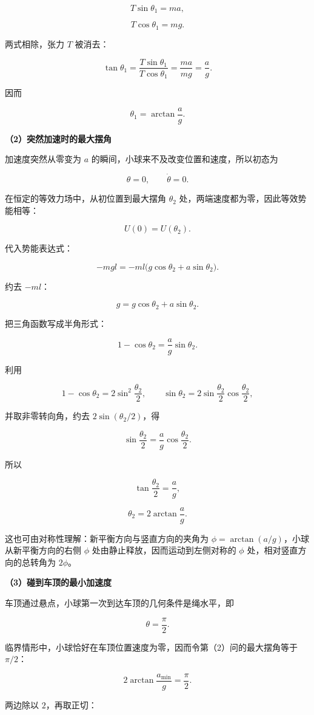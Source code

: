 \documentclass[12pt,a4paper,UTF8]{ctexart}
\begin{document}
\[T\sin\theta_1=ma,\]

\[T\cos\theta_1=mg.\]

两式相除，张力 \(T\) 被消去：

\[\tan\theta_1=\frac{T\sin\theta_1}{T\cos\theta_1}=\frac{ma}{mg}=\frac ag.\]

因而

\[\boxed{\theta_1=\arctan\frac ag}.\]

\textbf{（2）突然加速时的最大摆角}

加速度突然从零变为 \(a\) 的瞬间，小球来不及改变位置和速度，所以初态为

\[\theta=0,\qquad \dot\theta=0.\]

在恒定的等效力场中，从初位置到最大摆角 \(\theta_2\)
处，两端速度都为零，因此等效势能相等：

\[U(0)=U(\theta_2).\]

代入势能表达式：

\[-mgl=-ml\bigl(g\cos\theta_2+a\sin\theta_2\bigr).\]

约去 \(-ml\)：

\[g=g\cos\theta_2+a\sin\theta_2.\]

把三角函数写成半角形式：

\[1-\cos\theta_2=\frac ag\sin\theta_2.\]

利用

\[1-\cos\theta_2=2\sin^2\frac{\theta_2}{2},\qquad
\sin\theta_2=2\sin\frac{\theta_2}{2}\cos\frac{\theta_2}{2},\]

并取非零转向角，约去 \(2\sin(\theta_2/2)\)，得

\[\sin\frac{\theta_2}{2}=\frac ag\cos\frac{\theta_2}{2}.\]

所以

\[\tan\frac{\theta_2}{2}=\frac ag,\]

\[\boxed{\theta_2=2\arctan\frac ag}.\]

这也可由对称性理解：新平衡方向与竖直方向的夹角为
\(\phi=\arctan(a/g)\)，小球从新平衡方向的右侧 \(\phi\)
处由静止释放，因而运动到左侧对称的 \(\phi\) 处，相对竖直方向的总转角为
\(2\phi\)。

\textbf{（3）碰到车顶的最小加速度}

车顶通过悬点，小球第一次到达车顶的几何条件是绳水平，即

\[\theta=\frac\pi2.\]

临界情形中，小球恰好在车顶位置速度为零，因而令第（2）问的最大摆角等于
\(\pi/2\)：

\[2\arctan\frac{a_{\min}}g=\frac\pi2.\]

两边除以 \(2\)，再取正切：
\end{document}
